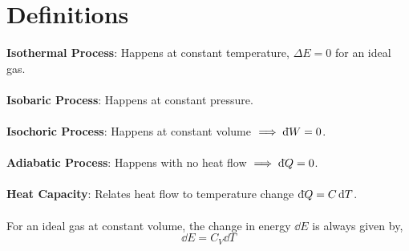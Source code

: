 \documentclass{book}
\newcommand{\dbar}{\mathrm{d}\hspace*{-0.08em}\bar{}\hspace*{0.1em}}
\begin{document}
\chapter{Definitions}
\textbf{Isothermal Process}:  Happens at constant temperature, $\Delta E = 0$ for an ideal gas.
\\\\
\textbf{Isobaric Process}: Happens at constant pressure.
\\\\
\textbf{Isochoric Process}: Happens at constant volume $\implies \dbar W = 0$.
\\\\
\textbf{Adiabatic Process}: Happens with no heat flow $\implies \dbar Q = 0$.
\\\\
\textbf{Heat Capacity}: Relates heat flow to temperature change $\dbar Q = C \dd{T}$.
\\\\
For an ideal gas at constant volume, the change in energy $\dd{E}$ is always given by,
\begin{equation}
	\dd{E} = C_V \dd{T}
\end{equation}
\end{document}
